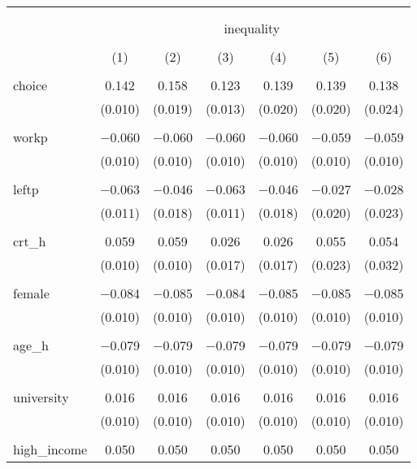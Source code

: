 
\begin{table}[!htbp] \centering 
  \caption{} 
  \label{} 
\begin{tabular}{@{\extracolsep{5pt}}lcccccc} 
\\[-1.8ex]\hline 
\hline \\[-1.8ex] 
\\[-1.8ex] & \multicolumn{6}{c}{inequality} \\ 
\\[-1.8ex] & (1) & (2) & (3) & (4) & (5) & (6)\\ 
\hline \\[-1.8ex] 
 choice & 0.142 & 0.158 & 0.123 & 0.139 & 0.139 & 0.138 \\ 
  & (0.010) & (0.019) & (0.013) & (0.020) & (0.020) & (0.024) \\ 
  & & & & & & \\ 
 workp & $-$0.060 & $-$0.060 & $-$0.060 & $-$0.060 & $-$0.059 & $-$0.059 \\ 
  & (0.010) & (0.010) & (0.010) & (0.010) & (0.010) & (0.010) \\ 
  & & & & & & \\ 
 leftp & $-$0.063 & $-$0.046 & $-$0.063 & $-$0.046 & $-$0.027 & $-$0.028 \\ 
  & (0.011) & (0.018) & (0.011) & (0.018) & (0.020) & (0.023) \\ 
  & & & & & & \\ 
 crt\_h & 0.059 & 0.059 & 0.026 & 0.026 & 0.055 & 0.054 \\ 
  & (0.010) & (0.010) & (0.017) & (0.017) & (0.023) & (0.032) \\ 
  & & & & & & \\ 
 female & $-$0.084 & $-$0.085 & $-$0.084 & $-$0.085 & $-$0.085 & $-$0.085 \\ 
  & (0.010) & (0.010) & (0.010) & (0.010) & (0.010) & (0.010) \\ 
  & & & & & & \\ 
 age\_h & $-$0.079 & $-$0.079 & $-$0.079 & $-$0.079 & $-$0.079 & $-$0.079 \\ 
  & (0.010) & (0.010) & (0.010) & (0.010) & (0.010) & (0.010) \\ 
  & & & & & & \\ 
 university & 0.016 & 0.016 & 0.016 & 0.016 & 0.016 & 0.016 \\ 
  & (0.010) & (0.010) & (0.010) & (0.010) & (0.010) & (0.010) \\ 
  & & & & & & \\ 
 high\_income & 0.050 & 0.050 & 0.050 & 0.050 & 0.050 & 0.050 \\ 

\end{tabular}
\end{table}
